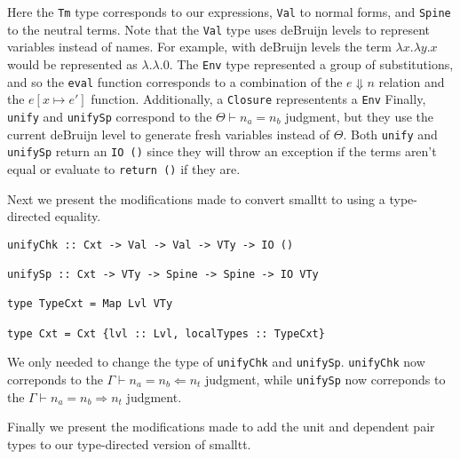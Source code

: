 \documentclass[sigplan]{acmart}
\newcommand{\stxEqJ}[3]{#1 \vdash #2 = #3}
\newcommand{\chkEqJ}[4]{#1 \vdash #2 = #3 \Leftarrow #4}
\newcommand{\synEqJ}[4]{#1 \vdash #2 = #3 \Rightarrow #4}
\newcommand{\steps}[2]{#1 \Downarrow #2}
\newcommand{\subst}[3]{#1 [#2 \mapsto #3]}
\begin{document}
Here the \lstinline{Tm} type corresponds to our expressions, \lstinline{Val} to normal forms, and \lstinline{Spine} to the neutral terms.
Note that the \lstinline{Val} type uses deBruijn levels to represent variables instead of names.
For example, with deBruijn levels the term $\lambda x. \lambda y. x$ would be represented as $\lambda. \lambda. 0$.
The \lstinline{Env} type represented a group of substitutions, and so the \lstinline{eval} function corresponds to a combination of the $\steps{e}{n}$ relation and the $\subst{e}{x}{e'}$ function.
Additionally, a \lstinline{Closure} representents a \lstinline{Env}
Finally, \lstinline{unify} and \lstinline{unifySp} correspond to the $\stxEqJ{\Theta}{n_a}{n_b}$ judgment, but they use the current deBruijn level to generate fresh variables instead of $\Theta$.
Both \lstinline{unify} and \lstinline{unifySp} return an \lstinline{IO ()} since they will throw an exception if the terms aren't equal or evaluate to \lstinline{return ()} if they are.

\newpage

Next we present the modifications made to convert smalltt to using a type-directed equality.

\begin{lstlisting}
unifyChk :: Cxt -> Val -> Val -> VTy -> IO ()

unifySp :: Cxt -> VTy -> Spine -> Spine -> IO VTy

type TypeCxt = Map Lvl VTy

type Cxt = Cxt {lvl :: Lvl, localTypes :: TypeCxt}
\end{lstlisting}

We only needed to change the type of \lstinline{unifyChk} and \lstinline{unifySp}.
\lstinline{unifyChk} now correponds to the $\chkEqJ{\Gamma}{n_a}{n_b}{n_t}$ judgment, while \lstinline{unifySp} now correponds to the $\synEqJ{\Gamma}{n_a}{n_b}{n_t}$ judgment.

Finally we present the modifications made to add the unit and dependent pair types to our type-directed version of smalltt.

\end{document}
